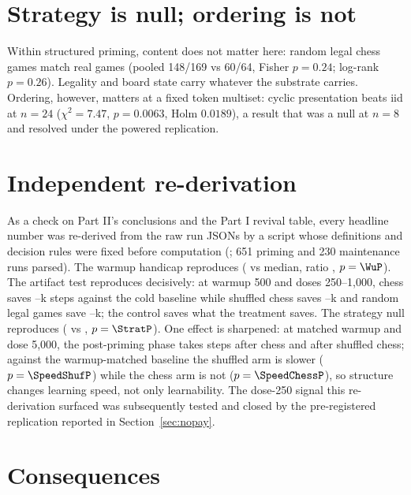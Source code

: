 \documentclass{article}
\begin{document}
\section{Strategy is null; ordering is not}
\label{sec:strategy}

Within structured priming, content does not matter here: random legal chess games match real
games (pooled 148/169 vs 60/64, Fisher $p=0.24$; log-rank $p=0.26$). Legality and board
state carry whatever the substrate carries. Ordering, however, matters at a fixed token
multiset: cyclic presentation beats iid at $n=24$ ($\chi^2=7.47$, $p=0.0063$, Holm
$0.0189$), a result that was a null at $n=8$ and resolved under the powered replication.

\section{Independent re-derivation}
\label{sec:rederive}

As a check on Part II's conclusions and the Part I revival table, every headline number was re-derived from the raw run
JSONs by a script whose definitions and decision rules were fixed before computation
(; 651 priming and 230 maintenance runs parsed). The
warmup handicap reproduces (\WuSlowMed{} vs \WuFastMed{} median, ratio \WuRatio,
$p=\WuP$). The artifact test reproduces decisively: at warmup 500 and doses 250--1{,}000,
chess saves \SaveChessLo--\SaveChessHi k steps against the cold baseline while shuffled
chess saves \SaveShufLo--\SaveShufHi k and random legal games save
\SaveRandLo--\SaveRandHi k; the control saves what the treatment saves. The strategy null
reproduces (\StratChessR{} vs \StratRandR, $p=\StratP$). One effect is sharpened: at matched
warmup and dose 5{,}000, the post-priming phase takes \SpeedChessB{} steps after chess and
\SpeedShufB{} after shuffled chess; against the warmup-matched baseline the shuffled arm is
slower ($p=\SpeedShufP$) while the chess arm is not ($p=\SpeedChessP$), so structure changes
learning speed, not only learnability. The dose-250 signal this re-derivation surfaced was subsequently tested
and closed by the pre-registered replication reported in Section~\ref{sec:nopay}.

\section{Consequences}
\label{sec:consequences}
\end{document}
